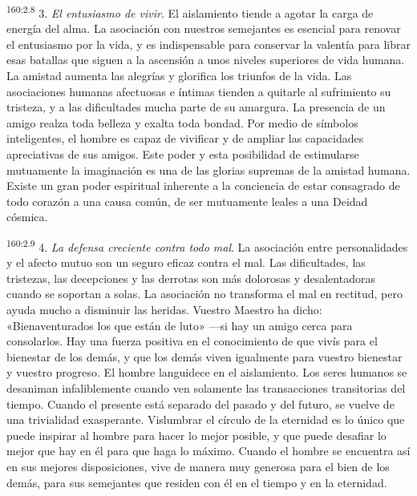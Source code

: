 \par 
\textsuperscript{160:2.8} 3. \textit{El entusiasmo de vivir}. El aislamiento tiende a agotar la carga de energía del alma. La asociación con nuestros semejantes es esencial para renovar el entusiasmo por la vida, y es indispensable para conservar la valentía para librar esas batallas que siguen a la ascensión a unos niveles superiores de vida humana. La amistad aumenta las alegrías y glorifica los triunfos de la vida. Las asociaciones humanas afectuosas e íntimas tienden a quitarle al sufrimiento su tristeza, y a las dificultades mucha parte de su amargura. La presencia de un amigo realza toda belleza y exalta toda bondad. Por medio de símbolos inteligentes, el hombre es capaz de vivificar y de ampliar las capacidades apreciativas de sus amigos. Este poder y esta posibilidad de estimularse mutuamente la imaginación es una de las glorias supremas de la amistad humana. Existe un gran poder espiritual inherente a la conciencia de estar consagrado de todo corazón a una causa común, de ser mutuamente leales a una Deidad cósmica.

\par 
\textsuperscript{160:2.9} 4. \textit{La defensa creciente contra todo mal}. La asociación entre personalidades y el afecto mutuo son un seguro eficaz contra el mal. Las dificultades, las tristezas, las decepciones y las derrotas son más dolorosas y desalentadoras cuando se soportan a solas. La asociación no transforma el mal en rectitud, pero ayuda mucho a disminuir las heridas. Vuestro Maestro ha dicho: «Bienaventurados los que están de luto» ---si hay un amigo cerca para consolarlos. Hay una fuerza positiva en el conocimiento de que vivís para el bienestar de los demás, y que los demás viven igualmente para vuestro bienestar y vuestro progreso. El hombre languidece en el aislamiento. Los seres humanos se desaniman infaliblemente cuando ven solamente las transacciones transitorias del tiempo. Cuando el presente está separado del pasado y del futuro, se vuelve de una trivialidad exasperante. Vislumbrar el círculo de la eternidad es lo único que puede inspirar al hombre para hacer lo mejor posible, y que puede desafiar lo mejor que hay en él para que haga lo máximo. Cuando el hombre se encuentra así en sus mejores disposiciones, vive de manera muy generosa para el bien de los demás, para sus semejantes que residen con él en el tiempo y en la eternidad.

